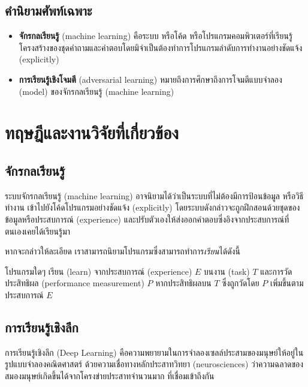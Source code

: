 \documentclass{cpereport}
\begin{document}
\section{คํานิยามศัพท์เฉพาะ}
\begin{itemize}
    \item \textbf{จักรกลเรียนรู้} (machine learning) คือระบบ หรือโค้ด หรือโปรแกรมคอมพิวเตอร์ที่เรียนรู้โครงสร้างของชุดคำถามและคำตอบโดยมิจำเป็นต้องทำการโปรแกรมลำดับการทำงานอย่างชัดแจ้ง (explicitly) 
    \item \textbf{การเรียนรู้เชิงโจมตี} (adversarial learning) หมายถึงการศึกษาถึงการโจมตีแบบจำลอง (model) ของจักรกลเรียนรู้ (machine learning)
\end{itemize}

\chapter{ทฤษฎีและงานวิจัยที่เกี่ยวข้อง}
\section{จักรกลเรียนรู้}
ระบบจักรกลเรียนรู้ (machine learning) อาจนิยามได้ว่าเป็นระบบที่ไม่ต้องมีการป้อนข้อมูล หรือวิธีทำงาน เข้าไปยังโค้ดโปรแกรมอย่างชัดแจ้ง (explicitly) โดยระบบดังกล่าวจะถูกฝึกสอนด้วยชุดของข้อมูลหรือประสบการณ์ (experience) และปรับตัวเองให้ส่งออกคำตอบซึ่งอิงจากประสบการณ์ที่ตนเองเคยได้เรียนรู้มา

หากจะกล่าวให้ละเอียด เราสามารถนิยามโปรแกรมซึ่งสามารถทำการ\textit{เรียน}ได้ดังนี้ \cite{Mitchell97}

\begin{definition}
โปรแกรมใดๆ เรียน (learn) จากประสบการณ์ (experience) $E$ บนงาน (task) $T$ และการวัดประสิทธิผล (performance measurement) $P$ หากประสิทธิผลบน $T$ ซึ่งถูกวัดโดย $P$ เพิ่มขึ้นตามประสบการณ์ $E$
\end{definition}

\section{การเรียนรู้เชิงลึก}
การเรียนรู้เชิงลึก (Deep Learning) คือความพยายามในการจำลองเซลล์ประสามของมนุษย์ให้อยู่ในรูปแบบจำลองคณิตศาสตร์
ด้วยความเชื่อทางหลักประสาทวิทยา (neurosciences) ว่าความฉลาดของสมองมนุษย์เกิดขึ้นได้จากโครงข่ายประสาทจำนวนมาก
ที่เชื่อมเข้าถึงกัน \cite{Goodfellow-et-al-2016}
\end{document}
